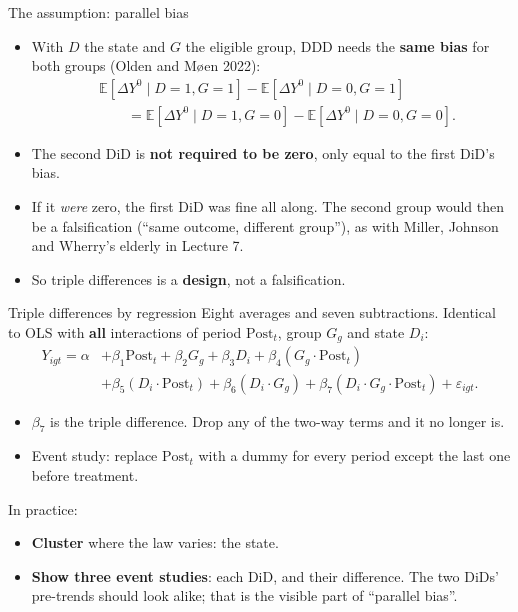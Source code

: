 \documentclass[
  11pt,
  ignorenonframetext,
  aspectratio=169,
]{beamer}
\providecommand{\tightlist}{%
  \setlength{\itemsep}{0pt}\setlength{\parskip}{0pt}}
\begin{document}
\begin{frame}{The assumption: parallel bias}
\protect{}\label{the-assumption-parallel-bias}
\begin{itemize}
\tightlist
\item
  With \(D\) the state and \(G\) the eligible group, DDD needs the
  \textbf{same bias} for both groups (Olden and Møen 2022): \[
  \begin{aligned}
  &\mathbb{E}[\Delta Y^0 \mid D=1, G=1] - \mathbb{E}[\Delta Y^0 \mid D=0, G=1] \\
  &\qquad = \mathbb{E}[\Delta Y^0 \mid D=1, G=0] - \mathbb{E}[\Delta Y^0 \mid D=0, G=0].
  \end{aligned}
  \]
\item
  The second DiD is \textbf{not required to be zero}, only equal to the
  first DiD's bias.
\item
  If it \emph{were} zero, the first DiD was fine all along. The second
  group would then be a falsification (``same outcome, different
  group''), as with Miller, Johnson and Wherry's elderly in Lecture 7.
\item
  So triple differences is a \textbf{design}, not a falsification.
\end{itemize}
\end{frame}

\begin{frame}{Triple differences by regression}
\protect{}\label{triple-differences-by-regression}
Eight averages and seven subtractions. Identical to OLS with
\textbf{all} interactions of period \(\text{Post}_t\), group \(G_g\) and
state \(D_i\): \[
\begin{aligned}
Y_{igt} = \alpha &+ \beta_1 \text{Post}_t + \beta_2 G_g + \beta_3 D_i + \beta_4 (G_g \cdot \text{Post}_t) \\
&+ \beta_5 (D_i \cdot \text{Post}_t) + \beta_6 (D_i \cdot G_g) + \beta_7 (D_i \cdot G_g \cdot \text{Post}_t) + \varepsilon_{igt}.
\end{aligned}
\]

\begin{itemize}
\tightlist
\item
  \(\beta_7\) is the triple difference. Drop any of the two-way terms
  and it no longer is.
\item
  Event study: replace \(\text{Post}_t\) with a dummy for every period
  except the last one before treatment.
\end{itemize}

\vspace{0.3em}

In practice:

\begin{itemize}
\tightlist
\item
  \textbf{Cluster} where the law varies: the state.
\item
  \textbf{Show three event studies}: each DiD, and their difference. The
  two DiDs' pre-trends should look alike; that is the visible part of
  ``parallel bias''.
\end{itemize}
\end{frame}
\end{document}

